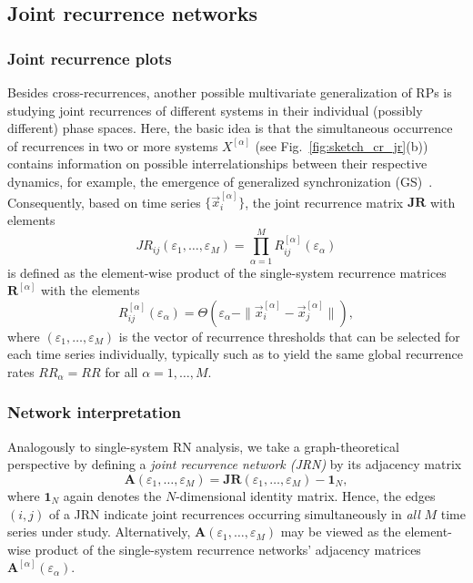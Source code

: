 	\subsection{Joint recurrence networks}
      		\subsubsection{Joint recurrence plots}
		Besides cross-recurrences, another possible multivariate generalization of RPs is studying joint recurrences of different systems in their individual (possibly different) phase spaces. Here, the basic idea is that the simultaneous occurrence of recurrences in two or more systems $X^{[\alpha]}$ (see Fig.~\ref{fig:sketch_cr_jr}(b)) contains information on possible interrelationships between their respective dynamics, for example, the emergence of generalized synchronization (GS)~\cite{romano2004,romano2005}. Consequently, based on time series $\{\vec{x}_i^{[\alpha]}\}$, the joint recurrence matrix $\mathbf{JR}$ with elements
\begin{equation}
JR_{ij}(\varepsilon_1,\dots,\varepsilon_M)=\prod_{\alpha=1}^M R_{ij}^{[\alpha]}(\varepsilon_\alpha)
\end{equation}
is defined as the element-wise product of the single-system recurrence matrices $\mathbf{R}^{[\alpha]}$ with the elements
\begin{equation}
R_{ij}^{[\alpha]}(\varepsilon_\alpha)=\Theta(\varepsilon_\alpha - \|\vec{x}_i^{[\alpha]} - \vec{x}_j^{[\alpha]} \|),
\end{equation}
where $(\varepsilon_1,\dots,\varepsilon_M)$ is the vector of recurrence thresholds that can be selected for each time series individually, typically such as to yield the same global recurrence rates $RR_\alpha=RR$ for all $\alpha=1,\dots,M$.


		\subsubsection{Network interpretation} \label{sec:jrn_classic}
		Analogously to single-system RN analysis, we take a graph-theoretical perspective by defining a \emph{joint recurrence network (JRN)} by its adjacency matrix
\begin{equation}
\mathbf{A}(\varepsilon_1,\dots,\varepsilon_M) = \mathbf{JR}(\varepsilon_1,\dots,\varepsilon_M) - \mathbf{1}_N,
\end{equation}
where $\mathbf{1}_N$ again denotes the $N$-dimensional identity matrix. Hence, the edges $(i,j)$ of a JRN indicate joint recurrences occurring simultaneously in \emph{all} $M$ time series under study. Alternatively, $\mathbf{A}(\varepsilon_1,\dots,\varepsilon_M)$ may be viewed as the element-wise product of the single-system recurrence networks' adjacency matrices $\mathbf{A}^{[\alpha]}(\varepsilon_\alpha)$.

